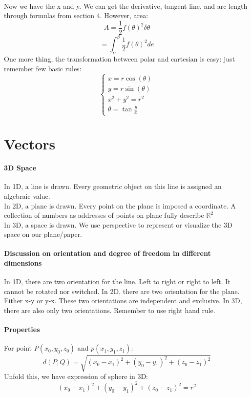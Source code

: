 \documentclass[11pt, oneside]{article}   	%
\begin{document}
\paragraph{}
Now we have the x and y. We can get the derivative, tangent line, and arc length through formulas from section 4. However, area: $$A = \frac{1}{2} f(\theta)^2 \delta \theta$$ $$ = \int_\alpha^\beta \frac{1}{2} f(\theta)^2 de$$
One more thing, the transformation between polar and cartesian is easy: just remember few basic rules:
\begin{equation}
  \begin{cases}
    x = r \cos(\theta)\\
    y =  r\sin(\theta)\\
    x^2 + y^2 = r^2 \\
    \theta = \tan{\frac{y}{x}}
  \end{cases}
\end{equation}

\section{Vectors}
\paragraph{3D Space}
In 1D, a line is drawn. Every geometric object on this line is assigned an algebraic value. \\
In 2D, a plane is drawn. Every point on the plane is imposed a coordinate. A collection of numbers as addresses of points on plane fully describe $\mathbb{R}^2$\\
In 3D, a space is drawn. We use perspective to represent or visualize the 3D space on our plane/paper.

\paragraph{Discussion on orientation and degree of freedom in different dimensions}
In 1D, there are two orientation for the line. Left to right or right to left. It cannot be rotated nor switched. 
In 2D, there are two orientation for the plane. Either x-y or y-x. These two orientations are independent and exclusive. 
In 3D, there are also only two orientations. Remember to use right hand rule. 

\paragraph{Properties}
For point $P(x_0,y_0,z_0)$ and $p(x_1,y_1,z_1)$: $$d(P,Q) = \sqrt{(x_0-x_1)^2+(y_0-y_1)^2+(z_0-z_1)^2}$$
Unfold this, we have expression of sphere in 3D: $$ (x_0-x_1)^2+(y_0-y_1)^2+(z_0-z_1)^2 = r^2 $$
\end{document}
